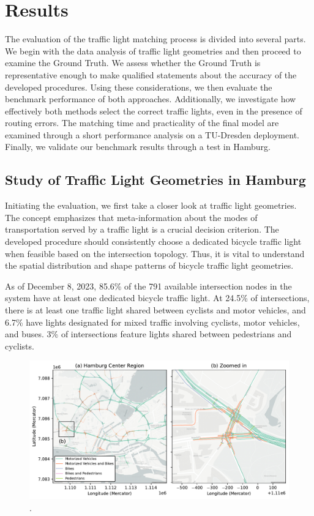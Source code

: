 \section{Results}

The evaluation of the traffic light matching process is divided into several parts. We begin with the data analysis of traffic light geometries and then proceed to examine the Ground Truth. We assess whether the Ground Truth is representative enough to make qualified statements about the accuracy of the developed procedures. Using these considerations, we then evaluate the benchmark performance of both approaches. Additionally, we investigate how effectively both methods select the correct traffic lights, even in the presence of routing errors. The matching time and practicality of the final model are examined through a short performance analysis on a TU-Dresden deployment. Finally, we validate our benchmark results through a test in Hamburg.

\subsection{Study of Traffic Light Geometries in Hamburg}

Initiating the evaluation, we first take a closer look at traffic light geometries. The concept emphasizes that meta-information about the modes of transportation served by a traffic light is a crucial decision criterion. The developed procedure should consistently choose a dedicated bicycle traffic light when feasible based on the intersection topology. Thus, it is vital to understand the spatial distribution and shape patterns of bicycle traffic light geometries.

As of December 8, 2023, 85.6\% of the 791 available intersection nodes in the system have at least one dedicated bicycle traffic light. At 24.5\% of intersections, there is at least one traffic light shared between cyclists and motor vehicles, and 6.7\% have lights designated for mixed traffic involving cyclists, motor vehicles, and buses. 3\% of intersections feature lights shared between pedestrians and cyclists.

\begin{figure}[htbp]
\centering
\includegraphics[width=\linewidth]{images/lanes-map.pdf}
\caption{.}
\label{fig:lanes-map}
\end{figure}

